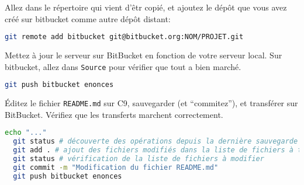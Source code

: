 \question Allez dans le répertoire qui vient d'êtr copié, et ajoutez
le dépôt que vous avez créé sur bitbucket comme autre dépôt distant:
\begin{lstlisting}[language=bash]
  git remote add bitbucket git@bitbucket.org:NOM/PROJET.git
\end{lstlisting}


\question Mettez à jour le serveur sur BitBucket en fonction de votre
serveur local.  Sur bitbucket, allez dans \texttt{Source} pour
vérifier que tout a bien marché.
\begin{lstlisting}[language=bash]
  git push bitbucket enonces
\end{lstlisting}



\question Éditez le fichier \texttt{README.md} sur C9, sauvegarder (et
``commitez''), et transférer sur BitBucket. Vérifiez que les
transferts marchent correctement.
\begin{lstlisting}[language=bash]
  echo "..."
  git status # découverte des opérations depuis la dernière sauvegarde
  git add . # ajout des fichiers modifiés dans la liste de fichiers à transférer
  git status # vérification de la liste de fichiers à modifier
  git commit -m "Modification du fichier README.md"
  git push bitbucket enonces
\end{lstlisting}
